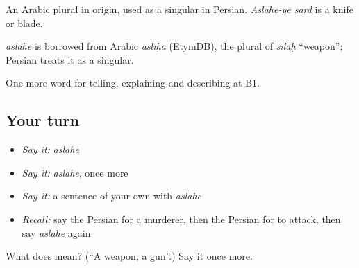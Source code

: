 An Arabic plural in origin, used as a singular in Persian. \emph{Aslahe-ye sard} is a knife or blade.

\begin{cousinweb}
\emph{aslahe} is borrowed from Arabic \emph{asliḥa} (EtymDB), the plural of \emph{silāḥ} \textquotedblleft{}weapon\textquotedblright{}; Persian treats it as a singular.
\end{cousinweb}

\begin{grammarlens}[title={What you've built}]
One more word for telling, explaining and describing at B1.
\end{grammarlens}

\subsection*{Your turn}
\begin{itemize}
\raggedright
  \item \emph{Say it:} \emph{aslahe}
  \item \emph{Say it:} \emph{aslahe}, once more
  \item \emph{Say it:} a sentence of your own with \emph{aslahe}
  \item \emph{Recall:} say the Persian for a murderer, then the Persian for to attack, then say \emph{aslahe} again
\end{itemize}

\begin{tcolorbox}[breakable,colback=teal!4,colframe=teal!35!black,title={Before you move on}]
What does  mean? (\textquotedblleft{}A weapon, a gun\textquotedblright{}.) Say it once more.
\end{tcolorbox}
